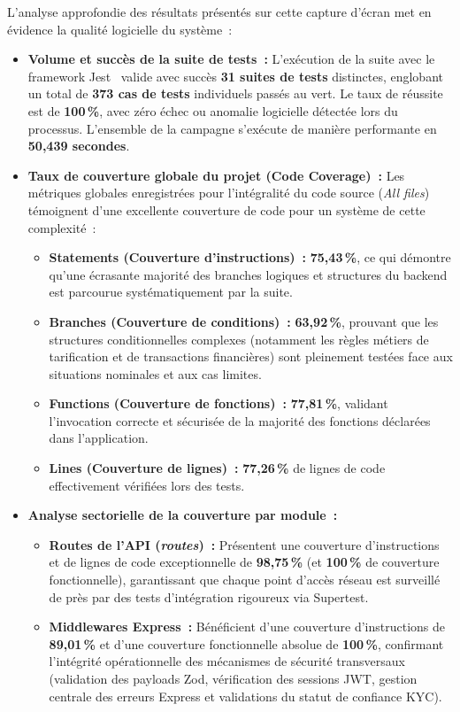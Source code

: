 \documentclass[12pt, a4paper, oneside]{report}
\begin{document}
L'analyse approfondie des résultats présentés sur cette capture d'écran met en évidence la qualité logicielle du système~:
\begin{itemize}[leftmargin=1.8em]
  \item \textbf{Volume et succès de la suite de tests~:} L'exécution de la suite avec le framework Jest~\cite{jest_docs} valide avec succès \textbf{31 suites de tests} distinctes, englobant un total de \textbf{373 cas de tests} individuels passés au vert. Le taux de réussite est de \textbf{100\,\%}, avec zéro échec ou anomalie logicielle détectée lors du processus. L'ensemble de la campagne s'exécute de manière performante en \textbf{50,439 secondes}.
  \item \textbf{Taux de couverture globale du projet (Code Coverage)~:} Les métriques globales enregistrées pour l'intégralité du code source (\textit{All files}) témoignent d'une excellente couverture de code pour un système de cette complexité~:
  \begin{itemize}
    \item \textbf{Statements (Couverture d'instructions)~:} \textbf{75,43\,\%}, ce qui démontre qu'une écrasante majorité des branches logiques et structures du backend est parcourue systématiquement par la suite.
    \item \textbf{Branches (Couverture de conditions)~:} \textbf{63,92\,\%}, prouvant que les structures conditionnelles complexes (notamment les règles métiers de tarification et de transactions financières) sont pleinement testées face aux situations nominales et aux cas limites.
    \item \textbf{Functions (Couverture de fonctions)~:} \textbf{77,81\,\%}, validant l'invocation correcte et sécurisée de la majorité des fonctions déclarées dans l'application.
    \item \textbf{Lines (Couverture de lignes)~:} \textbf{77,26\,\%} de lignes de code effectivement vérifiées lors des tests.
  \end{itemize}
  \item \textbf{Analyse sectorielle de la couverture par module~:}
  \begin{itemize}
    \item \textbf{Routes de l'API (\textit{routes})~:} Présentent une couverture d'instructions et de lignes de code exceptionnelle de \textbf{98,75\,\%} (et \textbf{100\,\%} de couverture fonctionnelle), garantissant que chaque point d'accès réseau est surveillé de près par des tests d'intégration rigoureux via Supertest.
    \item \textbf{Middlewares Express~:} Bénéficient d'une couverture d'instructions de \textbf{89,01\,\%} et d'une couverture fonctionnelle absolue de \textbf{100\,\%}, confirmant l'intégrité opérationnelle des mécanismes de sécurité transversaux (validation des payloads Zod, vérification des sessions JWT, gestion centrale des erreurs Express et validations du statut de confiance KYC).

\end{itemize}
\end{itemize}
\end{document}
